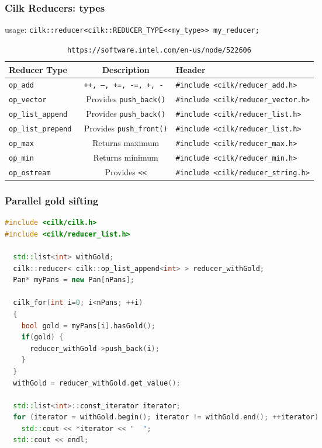 \documentclass[fleqn,xcolor=table,10pt,final]{beamer}
\begin{document}
\begin{frame}[fragile]
  \frametitle{Cilk Reducers: types}
    {\scriptsize
  usage: \verb|cilk::reducer<cilk::REDUCER_TYPE<<my_type>> my_reducer;|
  \begin{table}
    \begin{tabular}{l|c|l}
      Reducer Type & Description & Header\\
      \hline
      \tt{op\_add} & \tt{++, --, +=, -=, +, -} & \verb|#include <cilk/reducer_add.h>|\\
      \tt{op\_vector} & Provides \verb|push_back()|& \verb|#include <cilk/reducer_vector.h>|\\
      \tt{op\_list\_append} & Provides \verb|push_back()|& \verb|#include <cilk/reducer_list.h>|\\
      \tt{op\_list\_prepend} & Provides \verb|push_front()|& \verb|#include <cilk/reducer_list.h>|\\
      \tt{op\_max} & Returns maximum & \verb|#include <cilk/reducer_max.h>|\\
      \tt{op\_min} & Returns minimum & \verb|#include <cilk/reducer_min.h>|\\
      \tt{op\_ostream} & Provides \tt{<<}& \verb|#include <cilk/reducer_string.h>|
    \end{tabular}
    \caption{\tt{https://software.intel.com/en-us/node/522606}}
  \end{table}
}

\end{frame}


\begin{frame}[fragile]
  \frametitle{Parallel gold sifting}
  \begin{lstlisting}[language=C++,basicstyle=\scriptsize]
#include <cilk/cilk.h>
#include <cilk/reducer_list.h>

  std::list<int> withGold;
  cilk::reducer< cilk::op_list_append<int> > reducer_withGold;
  Pan* myPans = new Pan[nPans];

  cilk_for(int i=0; i<nPans; ++i)
  {
    bool gold = myPans[i].hasGold();
    if(gold) {
      reducer_withGold->push_back(i);
    }
  }
  withGold = reducer_withGold.get_value();

  std::list<int>::const_iterator iterator;
  for (iterator = withGold.begin(); iterator != withGold.end(); ++iterator)
    std::cout << *iterator << "  ";
  std::cout << endl;
  \end{lstlisting}
\end{frame}
\end{document}

